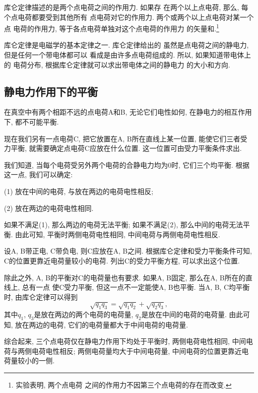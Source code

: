 \documentclass[11pt,a4paper]{ctexbook}
\begin{document}
库仑定律描述的是两个点电荷之间的作用力. 如果存
在两个以上点电荷, 那么, 每个点电荷都要受到其他所有
点电荷对它的作用力. 两个或两个以上点电荷对某一个点
电荷的作用力, 等于各点电荷单独对这个点电荷的作用力
的矢量和.\footnote{实验表明, 两个点电荷
之间的作用力不因第三个点电荷的存在而改变.}

库仑定律是电磁学的基本定律之一. 库仑定律给出的
虽然是点电荷之间的静电力, 但是任何一个带电体都可以
看成是由许多点电荷组成的. 所以, 如果知道带电体上的
电荷分布, 根据库仑定律就可以求出带电体之间的静电力
的大小和方向.

\subsection{静电力作用下的平衡}

在真空中有两个相距不远的点电荷A和B,
无论它们电性如何, 在静电力的相互作用下, 都不可能平衡.

现在我们另有一点电荷C, 把它放置在A, B所在直线上某一位置, 能使它们三者受力平衡, 就需要确定点电荷C应放在什么位置.
这一位置可由受力平衡条件求出.

我们知道, 当每个电荷受另外两个电荷的合静电力均为0时, 它们三个均平衡. 根据这一点, 我们可以确定:

(1) 放在中间的电荷, 与放在两边的电荷电性相反;

(2) 放在两边的电荷电性相同.

如果不满足(1), 那么两边的电荷无法平衡; 如果不满足(2), 那么中间的电荷无法平衡.
由此可知, 平衡时两侧电荷电性相同, 中间电荷与两侧电荷电性相反.

设A, B带正电, C带负电, 则C应放在A, B之间. 根据库仑定律和受力平衡条件可知,
C的位置更靠近电荷量较小的电荷. 列出C的受力平衡方程, 可以求出这个位置.

除此之外, A, B的平衡对C的电荷量也有要求. 如果A, B固定, 那么在A, B所在的直线上, 总有一点
使C受力平衡, 但这一点不一定能使A, B也平衡. 当A, B, C均平衡时, 由库仑定律可以得到
$$\sqrt{q_1q_3} = \sqrt{q_1q_2}+\sqrt{q_2q_3},$$
其中$q_1$, $q_3$是放在两边的两个电荷的电荷量, $q_2$是放在中间的电荷的电荷量.
由此可知, 放在两边的电荷, 它们的电荷量都大于中间电荷的电荷量.

综合起来, 三个点电荷仅在静电力作用下均处于平衡时, 两侧电荷电性相同, 中间电荷与两侧电荷电性相反; 两侧电荷量均大于中间电荷量, 中间电荷的位置更靠近电荷量较小的一侧.
\end{document}
